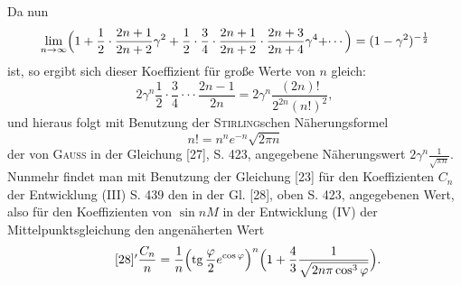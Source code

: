 \clearpage{}
\begingroup\small
\makeatletter\tagsleft@true\let\veqno\@@leqno\makeatother
\noindent Da nun
\[
\lim_{n\to\infty}\Bigl(1+\frac12\cdot\frac{2n+1}{2n+2}\gamma^2+\frac12\cdot\frac34\cdot\frac{2n+1}{2n+2}\cdot\frac{2n+3}{2n+4}\gamma^4+\cdotp\cdotp\cdotp\Bigr)=(1-\gamma^2)^{-\frac12}
\]
\noindent ist, so ergibt sich dieser Koeffizient für große Werte von \(n\) gleich:
\[
2\gamma^n\frac12\cdot\frac34\cdotp\cdotp\cdotp\frac{2n-1}{2n}=2\gamma^n\frac{(2n)!}{2^{2n}(n!)^2},
\]
\noindent und hieraus folgt mit Benutzung der \textsc{Stirling}schen Näherungsformel
\[n!=n^n e^{-n}\sqrt{2\pi n}\]
\noindent der von \textsc{Gauss} in der Gleichung [27], S. 423, angegebene Näherungswert \(2\gamma^n\frac1{\sqrt{\pi n}}\). Nunmehr findet man mit Benutzung der Gleichung [23] für den Koeffizienten \(C_n\) der Entwicklung (III) S. 439 den in der Gl. [28], oben S. 423, angegebenen Wert, also für den Koeffizienten von \(\sin nM\) in der Entwicklung (IV) der Mittelpunktsgleichung den angenäherten Wert
\begin{equation}\tag*{[28]$'$}
\frac{C_n}{n}=\frac1n\Bigl(\operatorname{tg}\frac\varphi2 e^{\cos\varphi}\Bigr)^n\Bigl(1+\frac43\frac1{\sqrt{2n\pi\cos^3\varphi}}\Bigr).
\end{equation}

